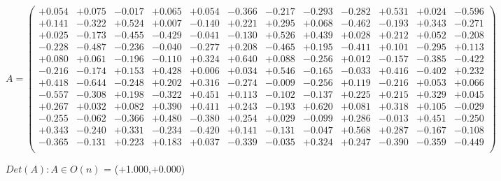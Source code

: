 \documentclass[9pt]{article}
\theoremstyle{plain}
\theoremstyle{definition}
\theoremstyle{remark}
\numberwithin{equation}{section}
\begin{document}
$A = \left(
\begin{array}{
cccccccccccc}
+0.054 & +0.075 & -0.017 & +0.065 & +0.054 & -0.366 & -0.217 & -0.293 & -0.282 & +0.531 & +0.024 & -0.596 \\
+0.141 & -0.322 & +0.524 & +0.007 & -0.140 & +0.221 & +0.295 & +0.068 & -0.462 & -0.193 & +0.343 & -0.271 \\
+0.025 & -0.173 & -0.455 & -0.429 & -0.041 & -0.130 & +0.526 & +0.439 & +0.028 & +0.212 & +0.052 & -0.208 \\
-0.228 & -0.487 & -0.236 & -0.040 & -0.277 & +0.208 & -0.465 & +0.195 & -0.411 & +0.101 & -0.295 & +0.113 \\
+0.080 & +0.061 & -0.196 & -0.110 & +0.324 & +0.640 & +0.088 & -0.256 & +0.012 & -0.157 & -0.385 & -0.422 \\
-0.216 & -0.174 & +0.153 & +0.428 & +0.006 & +0.034 & +0.546 & -0.165 & -0.033 & +0.416 & -0.402 & +0.232 \\
+0.418 & -0.644 & -0.248 & +0.202 & +0.316 & -0.274 & -0.009 & -0.256 & +0.119 & -0.216 & +0.053 & +0.066 \\
-0.557 & -0.308 & +0.198 & -0.322 & +0.451 & +0.113 & -0.102 & -0.137 & +0.225 & +0.215 & +0.329 & +0.045 \\
+0.267 & +0.032 & +0.082 & +0.390 & +0.411 & +0.243 & -0.193 & +0.620 & +0.081 & +0.318 & +0.105 & -0.029 \\
-0.255 & -0.062 & -0.366 & +0.480 & -0.380 & +0.254 & +0.029 & -0.099 & +0.286 & -0.013 & +0.451 & -0.250 \\
+0.343 & -0.240 & +0.331 & -0.234 & -0.420 & +0.141 & -0.131 & -0.047 & +0.568 & +0.287 & -0.167 & -0.108 \\
-0.365 & -0.131 & +0.223 & +0.183 & +0.037 & -0.339 & -0.035 & +0.324 & +0.247 & -0.390 & -0.359 & -0.449 \\
\end{array}
\right)$ \newline 

$Det(A) :   A \in O(n)$ = (+1.000,+0.000)
\end{document}
